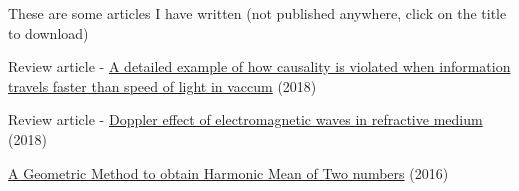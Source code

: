 

\begin{cventries}

  \cventry
    {These are some articles I have written (not published anywhere, click on the title to download)} %
    {} %
    {} %
    {} %
    {
      \begin{cvitems} %
        \item {Review article - \href{http://archisman.tk/articles/tachyon.pdf}{A detailed example of how causality is violated when information travels faster than speed of light in vaccum} (2018)}
        \item{Review article - \href{http://archisman.tk/articles/doppler_effect.pdf}{Doppler effect of electromagnetic waves in refractive medium} (2018)}
        \item{\href{http://archisman.tk/articles/Harmonic_Mean.pdf}{A Geometric Method to obtain Harmonic Mean of Two numbers} (2016)}
      \end{cvitems}
    }
\end{cventries}
